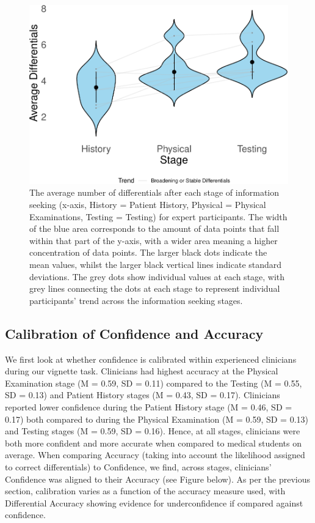\documentclass[a4paper, nobind]{templates/ociamthesis}
\begin{document}
\begin{figure}[H]
\includegraphics{_main_files/figure-latex/expdiffs-1} \caption[Online Study Appendix: Average Differentials by Stage for Expert Participants (Violin Plot)]{The average number of differentials after each stage of information seeking (x-axis, History = Patient History, Physical = Physical Examinations, Testing = Testing) for expert participants. The width of the blue area corresponds to the amount of data points that fall within that part of the y-axis, with a wider area meaning a higher concentration of data points. The larger black dots indicate the mean values, whilst the larger black vertical lines indicate standard deviations. The grey dots show individual values at each stage, with grey lines connecting the dots at each stage to represent individual participants' trend across the information seeking stages.}\label{fig:expdiffs}
\end{figure}

\newpage

\subsection{Calibration of Confidence and Accuracy}\label{calibration-of-confidence-and-accuracy}

We first look at whether confidence is calibrated within experienced clinicians during our vignette task. Clinicians had highest accuracy at the Physical Examination stage (M = 0.59, SD = 0.11) compared to the Testing (M = 0.55, SD = 0.13) and Patient History stages (M = 0.43, SD = 0.17). Clinicians reported lower confidence during the Patient History stage (M = 0.46, SD = 0.17) both compared to during the Physical Examination (M = 0.59, SD = 0.13) and Testing stages (M = 0.59, SD = 0.16). Hence, at all stages, clinicians were both more confident and more accurate when compared to medical students on average. When comparing Accuracy (taking into account the likelihood assigned to correct differentials) to Confidence, we find, across stages, clinicians' Confidence was aligned to their Accuracy (see Figure below). As per the previous section, calibration varies as a function of the accuracy measure used, with Differential Accuracy showing evidence for underconfidence if compared against confidence.
\end{document}
